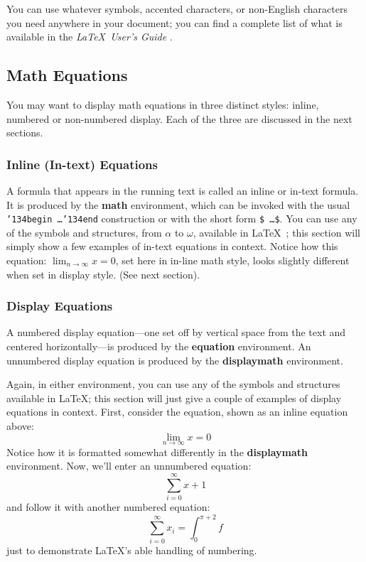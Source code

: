 You can use whatever symbols, accented characters, or non-English
characters you need anywhere in your document; you can find a complete
list of what is available in the \textit{\LaTeX\ User's Guide}
\cite{Lamport:LaTeX}.

\subsection{Math Equations}
You may want to display math equations in three distinct styles:
inline, numbered or non-numbered display. Each of
the three are discussed in the next sections.

\subsubsection{Inline (In-text) Equations}
A formula that appears in the running text is called an
inline or in-text formula. It is produced by the
\textbf{math} environment, which can be
invoked with the usual \texttt{{\char'134}begin\,\ldots{\char'134}end}
construction or with the short form \texttt{\$\,\ldots\$}. You
can use any of the symbols and structures,
from $\alpha$ to $\omega$, available in
\LaTeX~\cite{Lamport:LaTeX}; this section will simply show a
few examples of in-text equations in context. Notice how
this equation:
\begin{math}
    \lim_{n\rightarrow \infty}x=0
\end{math},
set here in in-line math style, looks slightly different when
set in display style.  (See next section).

\subsubsection{Display Equations}
A numbered display equation---one set off by vertical space from the
text and centered horizontally---is produced by the \textbf{equation}
environment. An unnumbered display equation is produced by the
\textbf{displaymath} environment.

Again, in either environment, you can use any of the symbols
and structures available in \LaTeX\@; this section will just
give a couple of examples of display equations in context.
First, consider the equation, shown as an inline equation above:
\begin{equation}
    \lim_{n\rightarrow \infty}x=0
\end{equation}
Notice how it is formatted somewhat differently in
the \textbf{displaymath}
environment. Now, we'll enter an unnumbered equation:
\begin{displaymath}
    \sum_{i=0}^{\infty} x + 1
\end{displaymath}
and follow it with another numbered equation:
\begin{equation}
    \sum_{i=0}^{\infty}x_i=\int_{0}^{\pi+2} f
\end{equation}
just to demonstrate \LaTeX's able handling of numbering.

